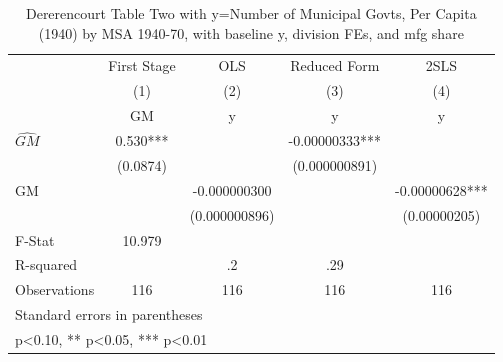 \begin{table}[htbp]\centering
\def\sym#1{\ifmmode^{#1}\else\(^{#1}\)\fi}
\caption{Dererencourt Table Two with y=Number of Municipal Govts, Per Capita (1940) by MSA 1940-70, with baseline y, division FEs, and mfg share}
\begin{tabular}{l*{4}{c}}
\toprule
                    & First Stage   &         OLS   &Reduced Form   &        2SLS   \\
                    &\multicolumn{1}{c}{(1)}&\multicolumn{1}{c}{(2)}&\multicolumn{1}{c}{(3)}&\multicolumn{1}{c}{(4)}\\
                    &\multicolumn{1}{c}{GM}&\multicolumn{1}{c}{y}&\multicolumn{1}{c}{y}&\multicolumn{1}{c}{y}\\
\midrule
$\hat{GM}$          &       0.530***&               & -0.00000333***&               \\
                    &    (0.0874)   &               &(0.000000891)   &               \\
\addlinespace
GM                  &               &-0.000000300   &               & -0.00000628***\\
                    &               &(0.000000896)   &               &(0.00000205)   \\
\midrule
F-Stat              &      10.979   &               &               &               \\
R-squared           &               &          .2   &         .29   &               \\
Observations        &         116   &         116   &         116   &         116   \\
\bottomrule
\multicolumn{5}{l}{\footnotesize Standard errors in parentheses}\\
\multicolumn{5}{l}{\footnotesize * p<0.10, ** p<0.05, *** p<0.01}\\
\end{tabular}
\end{table}
